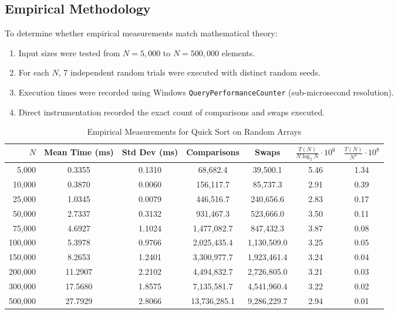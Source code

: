 \documentclass[12pt,a4paper]{article}
\theoremstyle{plain}
\theoremstyle{definition}
\theoremstyle{remark}
\begin{document}
\subsection{Empirical Methodology}
To determine whether empirical measurements match mathematical theory:
\begin{enumerate}
    \item Input sizes were tested from $N = 5{,}000$ to $N = 500{,}000$ elements.
    \item For each $N$, 7 independent random trials were executed with distinct random seeds.
    \item Execution times were recorded using Windows \texttt{QueryPerformanceCounter} (sub-microsecond resolution).
    \item Direct instrumentation recorded the exact count of comparisons and swaps executed.
\end{enumerate}

\begin{table}[h!]
\centering
\footnotesize
\setlength{\tabcolsep}{3.5pt}
\caption{Empirical Measurements for Quick Sort on Random Arrays}
\label{tab:empirical_data}
\begin{tabular}{rcccccc}
\toprule
$N$ & \textbf{Mean Time (ms)} & \textbf{Std Dev (ms)} & \textbf{Comparisons} & \textbf{Swaps} & $\frac{T(N)}{N \log_2 N} \cdot 10^6$ & $\frac{T(N)}{N^2} \cdot 10^8$ \\
\midrule
5,000   & 0.3355  & 0.1310 & 68,682.4    & 39,500.1   & 5.46 & 1.34 \\
10,000  & 0.3870  & 0.0060 & 156,117.7   & 85,737.3   & 2.91 & 0.39 \\
25,000  & 1.0345  & 0.0079 & 446,516.7   & 240,656.6  & 2.83 & 0.17 \\
50,000  & 2.7337  & 0.3132 & 931,467.3   & 523,666.0  & 3.50 & 0.11 \\
75,000  & 4.6927  & 1.1024 & 1,477,082.7 & 847,432.3  & 3.87 & 0.08 \\
100,000 & 5.3978  & 0.9766 & 2,025,435.4 & 1,130,509.0 & 3.25 & 0.05 \\
150,000 & 8.2653  & 1.2401 & 3,300,977.7 & 1,923,461.4 & 3.24 & 0.04 \\
200,000 & 11.2907 & 2.2102 & 4,494,832.7 & 2,726,805.0 & 3.21 & 0.03 \\
300,000 & 17.5680 & 1.8575 & 7,135,581.7 & 4,541,960.4 & 3.22 & 0.02 \\
500,000 & 27.7929 & 2.8066 & 13,736,285.1& 9,286,229.7 & 2.94 & 0.01 \\
\bottomrule
\end{tabular}
\end{table}
\end{document}
